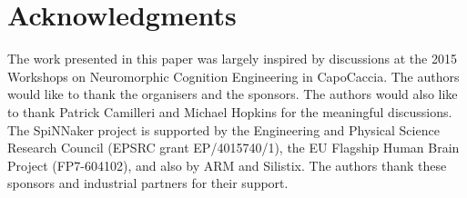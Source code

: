 \documentclass[pdftex]{bioinfo}
\begin{document}





	


\section*{Acknowledgments}
The work presented in this paper was largely inspired by discussions at the 2015 Workshops on Neuromorphic Cognition Engineering in CapoCaccia.
The authors would like to thank the organisers and the sponsors.
The authors would also like to thank Patrick Camilleri and Michael Hopkins for the meaningful discussions.
The SpiNNaker project is supported by the Engineering and Physical Science Research Council (EPSRC grant EP/4015740/1), the EU Flagship Human Brain Project (FP7-604102), and also by ARM and Silistix.
The authors thank these sponsors and industrial partners for their support.



%
\end{document}

